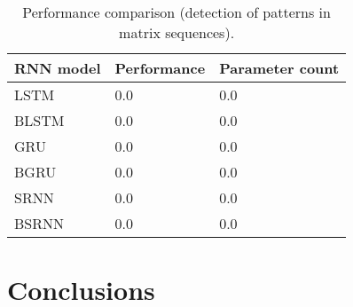 \documentclass[a4paper,11pt]{article}
\begin{document}
\begin{table}
\begin{tabular}{ |l|l|l| }
  \hline
   RNN model & Performance & Parameter count \\
  \hline   
   LSTM &  0.0  & 0.0 \\
   BLSTM &  0.0  & 0.0 \\
   GRU &  0.0  & 0.0 \\
   BGRU &  0.0  & 0.0 \\
   SRNN &  0.0  & 0.0 \\
   BSRNN &  0.0  & 0.0 \\
  \hline   
\end{tabular}
  \caption{Performance comparison (detection of patterns in matrix sequences).}
\label{table:patterns_in_matrix_sequence}
\end{table}








\section{Conclusions}
\end{document}
